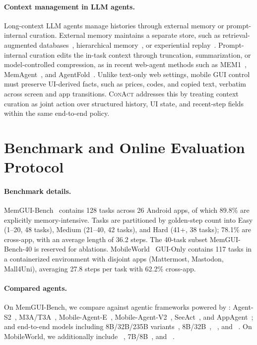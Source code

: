 \documentclass{llmxive}
\providecommand{\llmname}[1]{{\fontfamily{pcr}\selectfont{#1}}}
\providecommand{\conact}{\textsc{ConAct}\xspace}
\begin{document}
\paragraph{Context management in LLM agents.}
Long-context LLM agents manage histories through external memory or prompt-internal curation. 
External memory maintains a separate store, such as retrieval-augmented databases~\cite{lewis2020retrieval,chhikara2025mem0,xu2026mem}, hierarchical memory~\cite{zhang2026g}, or experiential replay~\cite{zhao2024expel}. 
Prompt-internal curation edits the in-task context through truncation, summarization, or model-controlled compression, as in recent web-agent methods such as MEM1~\cite{zhou2025mem1}, MemAgent~\cite{yu2025memagent}, and AgentFold~\cite{ye2025agentfold}. 
Unlike text-only web settings, mobile GUI control must preserve UI-derived facts, such as prices, codes, and copied text, verbatim across screen and app transitions. 
\conact addresses this by treating context curation as joint action over structured history, UI state, and recent-step fields within the same end-to-end policy.

\section{Benchmark and Online Evaluation Protocol}
\label{sec:appendix-eval-protocol}

\paragraph{Benchmark details.}
MemGUI-Bench~\cite{liu2026memgui} contains 128 tasks across 26 Android apps, of which 89.8\% are explicitly memory-intensive. Tasks are partitioned by golden-step count into Easy (1--20, 48 tasks), Medium (21--40, 42 tasks), and Hard (41+, 38 tasks); 78.1\% are cross-app, with an average length of 36.2 steps. The 40-task subset MemGUI-Bench-40 is reserved for ablations. MobileWorld~\cite{kong2025mobileworld} GUI-Only contains 117 tasks in a containerized environment with disjoint apps (Mattermost, Mastodon, Mall4Uni), averaging 27.8 steps per task with 62.2\% cross-app.

\paragraph{Compared agents.}
On MemGUI-Bench, we compare against agentic frameworks powered by \llmname{Gemini-2.5-Pro}: Agent-S2~\cite{agashe2025agent}, M3A/T3A~\cite{rawles2025androidworld}, Mobile-Agent-E~\cite{wang2025mobileagentselfevolving}, Mobile-Agent-V2~\cite{wang2024mobile}, SeeAct~\cite{zheng2024seeact}, and AppAgent~\cite{zhang2025appagent}; and end-to-end models including \llmname{Qwen3-VL} 8B/32B/235B variants~\cite{bai2025qwen3}, \llmname{GUI-Owl-1.5} 8B/32B~\cite{xu2026mobile}, \llmname{UI-TARS-1.5-7B}~\cite{qin2025ui}, and \llmname{UI-Venus-7B}~\cite{gu2025ui-venus}. On MobileWorld, we additionally include \llmname{ScaleCUA-7B}~\cite{ScaleCUA2025}, \llmname{OpenMobile} 7B/8B~\cite{OpenMobile2025}, and \llmname{ClawGUI-2B}~\cite{tang2026clawgui}.
\end{document}
